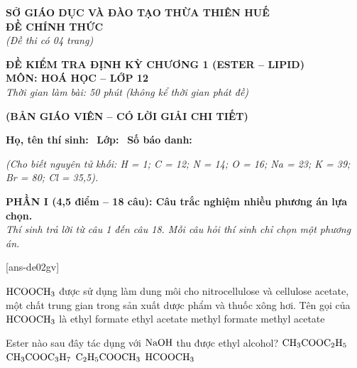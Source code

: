 \documentclass[12pt,a4paper]{article}
\begin{document}
\thispagestyle{firstpage}

\noindent
\begin{minipage}[t]{0.44\textwidth}
	\centering\fontsize{10pt}{12pt}\selectfont
	\textbf{SỞ GIÁO DỤC VÀ ĐÀO TẠO THỪA THIÊN HUẾ}\\
	\textbf{ĐỀ CHÍNH THỨC}\\
	\textit{(Đề thi có 04 trang)}
\end{minipage}\hfill
\begin{minipage}[t]{0.54\textwidth}
	\centering\small
	\textbf{ĐỀ KIỂM TRA ĐỊNH KỲ CHƯƠNG 1 (ESTER -- LIPID)}\\
	\textbf{MÔN: HOÁ HỌC -- LỚP 12}\\
	\textit{Thời gian làm bài: 50 phút (không kể thời gian phát đề)}\\
\end{minipage}

\smallskip
\begin{center}
	{\color{hfRed}\textbf{\large (BẢN GIÁO VIÊN -- CÓ LỜI GIẢI CHI TIẾT)}}
\end{center}

\smallskip
\noindent\hrulefill
\smallskip

\noindent\textbf{Họ, tên thí sinh:} \dotfill\ \textbf{Lớp:} \dotfill\ \textbf{Số báo danh:} \dotfill

\smallskip
\noindent\textit{(Cho biết nguyên tử khối: H = 1; C = 12; N = 14; O = 16; Na = 23; K = 39; Br = 80; Cl = 35,5).}
\smallskip

\noindent
\textbf{PHẦN I (4,5 điểm -- 18 câu): Câu trắc nghiệm nhiều phương án lựa chọn.}\\
\textit{Thí sinh trả lời từ câu 1 đến câu 18. Mỗi câu hỏi thí sinh chỉ chọn một phương án.}

[ans-de02gv]

\begin{ex}
$\ce{HCOOCH3}$ được sử dụng làm dung môi cho nitrocellulose và cellulose acetate, một chất trung gian trong sản xuất dược phẩm và thuốc xông hơi. Tên gọi của $\ce{HCOOCH3}$ là
\choice
{ethyl formate}
{ethyl acetate}
{\True methyl formate}
{methyl acetate}
\end{ex}

\begin{ex}
Ester nào sau đây tác dụng với $\ce{NaOH}$ thu được ethyl alcohol?
\choice
{\True $\ce{CH3COOC2H5}$}
{$\ce{CH3COOC3H7}$}
{$\ce{C2H5COOCH3}$}
{$\ce{HCOOCH3}$}
\end{ex}
\end{document}
